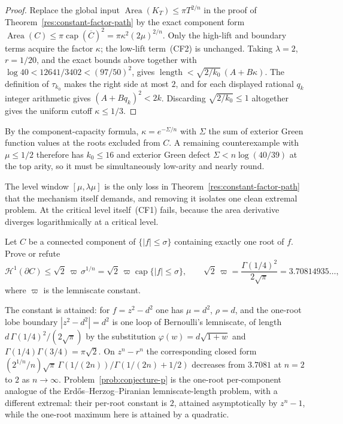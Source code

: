 \documentclass[11pt]{article}
\begin{document}
\begin{proof}
Replace the global input $\operatorname{Area}(K_T)\le\pi T^{2/n}$ in the proof
of Theorem~\ref{res:constant-factor-path} by the exact component form
$\operatorname{Area}(C)\le\pi\operatorname{cap}(\overline C)^2
 =\pi\kappa^2(2\mu)^{2/n}$.  Only the high-lift and boundary terms acquire the
factor $\kappa$; the low-lift term~(CF2) is unchanged.  Taking $\lambda=2$,
$r=1/20$, and the exact bounds above together with
$\log40<12641/3402<(97/50)^2$, gives
$\operatorname{length}<\sqrt{2/k_0}\,(A+B\kappa)$.  The definition of
$\tau_{k_0}$ makes the right side at most $2$, and for each displayed rational
$q_k$ integer arithmetic gives $(A+Bq_k)^2<2k$.  Discarding
$\sqrt{2/k_0}\le1$ altogether gives the uniform cutoff $\kappa\le1/3$.
\end{proof}

By the component-capacity formula, $\kappa=e^{-\Sigma/n}$ with $\Sigma$ the sum
of exterior Green function values at the roots excluded from $C$.  A remaining
counterexample with $\mu\le1/2$ therefore has $k_0\le16$ and exterior Green
defect $\Sigma<n\log(40/39)$ at the top arity, so it must be simultaneously
low-arity and nearly round.

The level window $[\mu,\lambda\mu]$ is the only loss in
Theorem~\ref{res:constant-factor-path} that the mechanism itself demands, and
removing it isolates one clean extremal problem.  At the critical level
itself~(CF1) fails, because the area derivative diverges logarithmically at a
critical level.

\begin{problem}\label{prob:conjecture-p}
Let $C$ be a connected component of $\{|f|\le\sigma\}$ containing exactly one
root of $f$.  Prove or refute
\[
 \mathcal H^1(\partial C)\le\sqrt2\,\varpi\,\sigma^{1/n}
 =\sqrt2\,\varpi\operatorname{cap}\{|f|\le\sigma\},
 \qquad
 \sqrt2\,\varpi=\frac{\Gamma(1/4)^2}{2\sqrt\pi}=3.70814935\ldots,
\]
where $\varpi$ is the lemniscate constant.
\end{problem}

The constant is attained: for $f=z^2-d^2$ one has $\mu=d^2$, $\rho=d$, and the
one-root lobe boundary $|z^2-d^2|=d^2$ is one loop of Bernoulli's lemniscate,
of length $d\,\Gamma(1/4)^2/(2\sqrt\pi)$ by the substitution
$\varphi(w)=d\sqrt{1+w}$ and $\Gamma(1/4)\Gamma(3/4)=\pi\sqrt2$.  On
$z^n-r^n$ the corresponding closed form
$(2^{1/n}/n)\sqrt\pi\,\Gamma(1/(2n))/\Gamma(1/(2n)+1/2)$ decreases from
$3.7081$ at $n=2$ to $2$ as $n\to\infty$.  Problem~\ref{prob:conjecture-p} is
the one-root per-component analogue of the Erd\H{o}s--Herzog--Piranian
lemniscate-length problem, with a different extremal: their per-root constant
is $2$, attained asymptotically by $z^n-1$, while the one-root maximum here is
attained by a quadratic.
\end{document}
